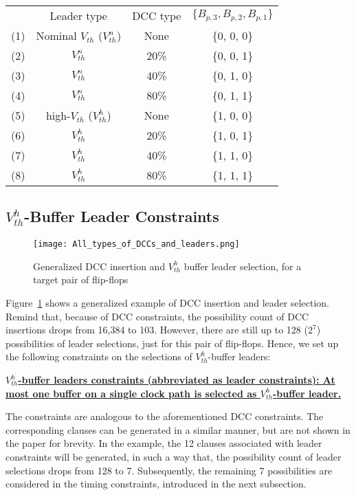 {\small
\begin{tabular}{  c  c  c  c  }
  	 & Leader type & DCC type & $\{B_{p,3}, B_{p,2}, B_{p,1}\}$ \\ 
  	(1)\quad & Nominal $V_{th}$ ($V_{th}^n$) & None & \{0, 0, 0\} \\ 
  	(2)\quad & $V_{th}^n$ &20\% &  \{0, 0, 1\} \\ 
  	(3)\quad & $V_{th}^n$ &40\% &  \{0, 1, 0\} \\ 
  	(4)\quad & $V_{th}^n$ &80\% &  \{0, 1, 1\} \\ 
	(5)\quad & high-$V_{th}$ ($V_{th}^h$) & None & \{1, 0, 0\} \\ 
  	(6)\quad & $V_{th}^h$ & 20\% &  \{1, 0, 1\} \\ 
  	(7)\quad & $V_{th}^h$ & 40\% &  \{1, 1, 0\} \\ 
  	(8)\quad & $V_{th}^h$ & 80\% &  \{1, 1, 1\} \\ 
\end{tabular}}

\subsection{$V_{th}^h$-Buffer Leader Constraints}
\begin{figure}
	\centering
	\texttt{[image: All\_types\_of\_DCCs\_and\_leaders.png]}
	\caption{Generalized DCC insertion and $V_{th}^h$ buffer leader selection, for a target pair of flip-flops}
	\label{fig:leadertype}
\end{figure}

Figure~\ref{fig:leadertype} shows a generalized example of DCC insertion and leader selection. Remind that, because of DCC constraints, the possibility count of DCC insertions drops from 16,384 to 103. However, there are still up to 128 ($2^7$) possibilities of leader selections, just for this pair of flip-flops. Hence, we set up the following constraints on the selections of $V_{th}^h$-buffer leaders:

\noindent \textbf{\uline{$V_{th}^h$-buffer leaders constraints (abbreviated as leader constraints): At most one buffer on a single clock path is selected as $V_{th}^h$-buffer leader.}}

The constraints are analogous to the aforementioned DCC constraints. The corresponding clauses can be generated in a similar manner, but are not shown in the paper for brevity. In the example, the 12 clauses associated with leader constraints will be generated, in such a way that, the possibility count of leader selections drops from 128 to 7. Subsequently, the remaining 7 possibilities are considered in the timing constraints, introduced in the next subsection.

